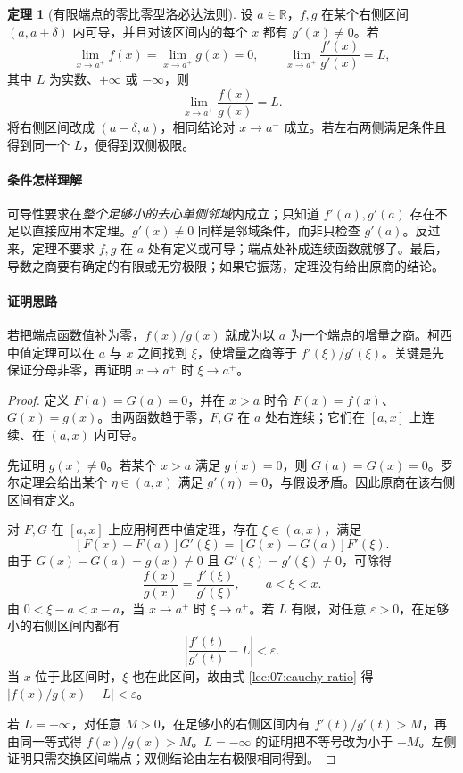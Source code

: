 \documentclass[UTF8,fontset=fandol,12pt,oneside,openany]{ctexrep}
\newcommand{\R}{\mathbb R}
\theoremstyle{definition}
\newtheorem{theorem}{定理}[chapter]
\begin{document}
\begin{theorem}[有限端点的零比零型洛必达法则]
\label{lec:07:zero-theorem}
设 $a\in\R$，$f,g$ 在某个右侧区间 $(a,a+\delta)$ 内可导，并且对该区间内的每个 $x$ 都有 $g'(x)\ne0$。若
\[
\lim_{x\to a^+}f(x)=\lim_{x\to a^+}g(x)=0,
\qquad
\lim_{x\to a^+}\frac{f'(x)}{g'(x)}=L,
\]
其中 $L$ 为实数、$+\infty$ 或 $-\infty$，则
\[
\lim_{x\to a^+}\frac{f(x)}{g(x)}=L.
\]
将右侧区间改成 $(a-\delta,a)$，相同结论对 $x\to a^-$ 成立。若左右两侧满足条件且得到同一个 $L$，便得到双侧极限。
\end{theorem}

\paragraph{条件怎样理解}
可导性要求在\emph{整个足够小的去心单侧邻域}内成立；只知道 $f'(a),g'(a)$ 存在不足以直接应用本定理。$g'(x)\ne0$ 同样是邻域条件，而非只检查 $g'(a)$。反过来，定理不要求 $f,g$ 在 $a$ 处有定义或可导；端点处补成连续函数就够了。最后，导数之商要有确定的有限或无穷极限；如果它振荡，定理没有给出原商的结论。

\paragraph{证明思路}
若把端点函数值补为零，$f(x)/g(x)$ 就成为以 $a$ 为一个端点的增量之商。柯西中值定理可以在 $a$ 与 $x$ 之间找到 $\xi$，使增量之商等于 $f'(\xi)/g'(\xi)$。关键是先保证分母非零，再证明 $x\to a^+$ 时 $\xi\to a^+$。

\begin{proof}
定义 $F(a)=G(a)=0$，并在 $x>a$ 时令 $F(x)=f(x)$、$G(x)=g(x)$。由两函数趋于零，$F,G$ 在 $a$ 处右连续；它们在 $[a,x]$ 上连续、在 $(a,x)$ 内可导。

先证明 $g(x)\ne0$。若某个 $x>a$ 满足 $g(x)=0$，则 $G(a)=G(x)=0$。罗尔定理会给出某个 $\eta\in(a,x)$ 满足 $g'(\eta)=0$，与假设矛盾。因此原商在该右侧区间有定义。

对 $F,G$ 在 $[a,x]$ 上应用柯西中值定理，存在 $\xi\in(a,x)$，满足
\[
[F(x)-F(a)]G'(\xi)
=[G(x)-G(a)]F'(\xi).
\]
由于 $G(x)-G(a)=g(x)\ne0$ 且 $G'(\xi)=g'(\xi)\ne0$，可除得
\begin{equation}
\frac{f(x)}{g(x)}=\frac{f'(\xi)}{g'(\xi)},
\qquad a<\xi<x.
\label{lec:07:cauchy-ratio}
\end{equation}
由 $0<\xi-a<x-a$，当 $x\to a^+$ 时 $\xi\to a^+$。若 $L$ 有限，对任意 $\varepsilon>0$，在足够小的右侧区间内都有
\[
\left|\frac{f'(t)}{g'(t)}-L\right|<\varepsilon.
\]
当 $x$ 位于此区间时，$\xi$ 也在此区间，故由式 \eqref{lec:07:cauchy-ratio} 得 $|f(x)/g(x)-L|<\varepsilon$。

若 $L=+\infty$，对任意 $M>0$，在足够小的右侧区间内有 $f'(t)/g'(t)>M$，再由同一等式得 $f(x)/g(x)>M$。$L=-\infty$ 的证明把不等号改为小于 $-M$。左侧证明只需交换区间端点；双侧结论由左右极限相同得到。
\end{proof}
\end{document}
